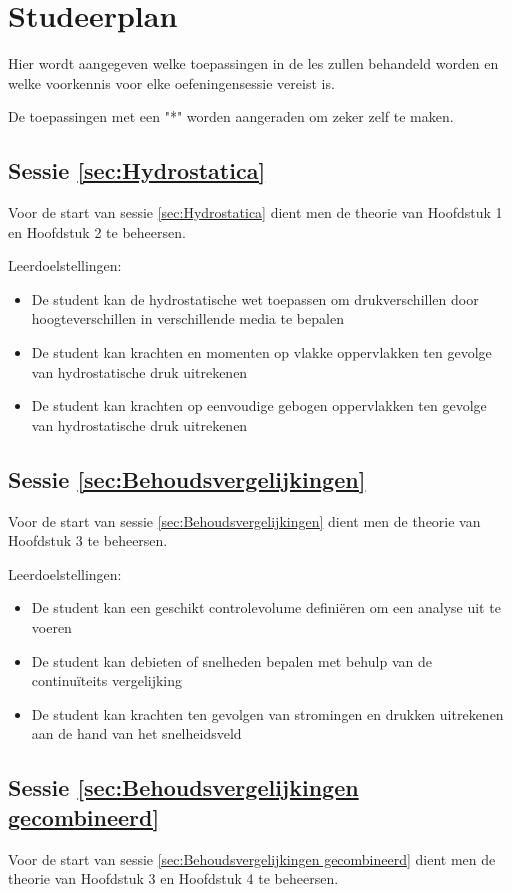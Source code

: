 \chapter{Studeerplan}
Hier wordt aangegeven welke toepassingen in de les zullen behandeld worden en welke voorkennis voor elke oefeningensessie vereist is.

De toepassingen met een "*" worden aangeraden om zeker zelf te maken.
	\section*{Sessie \ref{sec:Hydrostatica}}
Voor de start van sessie \ref{sec:Hydrostatica} dient men de theorie van Hoofdstuk 1 en Hoofdstuk 2 te beheersen.

Leerdoelstellingen:
\begin{itemize}
	\item De student kan de hydrostatische wet toepassen om drukverschillen door hoogteverschillen in verschillende media te bepalen
	\item De student kan krachten en momenten op vlakke oppervlakken ten gevolge van hydrostatische druk uitrekenen
	\item De student kan krachten op eenvoudige gebogen oppervlakken ten gevolge van hydrostatische druk uitrekenen
\end{itemize}
	
	\section*{Sessie \ref{sec:Behoudsvergelijkingen}}
Voor de start van sessie \ref{sec:Behoudsvergelijkingen} dient men de theorie van Hoofdstuk 3 te beheersen.

Leerdoelstellingen:
\begin{itemize}
	\item De student kan een geschikt controlevolume definiëren om een analyse uit te voeren
	\item De student kan debieten of snelheden bepalen met behulp van de continuïteits vergelijking
	\item De student kan krachten ten gevolgen van stromingen en drukken uitrekenen aan de hand van het snelheidsveld
\end{itemize}

	\section*{Sessie \ref{sec:Behoudsvergelijkingen gecombineerd}}
Voor de start van sessie \ref{sec:Behoudsvergelijkingen gecombineerd} dient men de theorie van Hoofdstuk 3 en Hoofdstuk 4 te beheersen.

